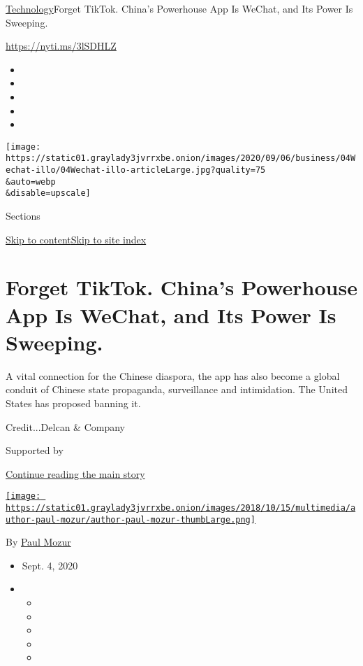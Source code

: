 \href{/section/technology}{Technology}\textbar{}Forget TikTok. China's
Powerhouse App Is WeChat, and Its Power Is Sweeping.

\url{https://nyti.ms/3lSDHLZ}

\begin{itemize}
\item
\item
\item
\item
\item
\end{itemize}

\texttt{[image: https://static01.graylady3jvrrxbe.onion/images/2020/09/06/business/04Wechat-illo/04Wechat-illo-articleLarge.jpg?quality=75\\\&auto=webp\\\&disable=upscale]}

Sections

\protect\hyperlink{site-content}{Skip to
content}\protect\hyperlink{site-index}{Skip to site index}

\hypertarget{forget-tiktok-chinas-powerhouse-app-is-wechat-and-its-power-is-sweeping}{%
\section{Forget TikTok. China's Powerhouse App Is WeChat, and Its Power
Is
Sweeping.}\label{forget-tiktok-chinas-powerhouse-app-is-wechat-and-its-power-is-sweeping}}

A vital connection for the Chinese diaspora, the app has also become a
global conduit of Chinese state propaganda, surveillance and
intimidation. The United States has proposed banning it.

Credit...Delcan \& Company

Supported by

\protect\hyperlink{after-sponsor}{Continue reading the main story}

\href{https://www.nytimes3xbfgragh.onion/by/paul-mozur}{\texttt{[image: https://static01.graylady3jvrrxbe.onion/images/2018/10/15/multimedia/author-paul-mozur/author-paul-mozur-thumbLarge.png]}}

By \href{https://www.nytimes3xbfgragh.onion/by/paul-mozur}{Paul Mozur}

\begin{itemize}
\item
  Sept. 4, 2020
\item
  \begin{itemize}
  \item
  \item
  \item
  \item
  \item
  \end{itemize}
\end{itemize}

